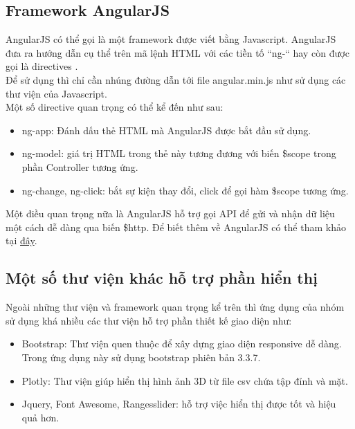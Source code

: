\subsection{Framework AngularJS}
AngularJS có thể gọi là một framework được viết bằng Javascript. AngularJS đưa ra hướng dẫn cụ thể trên mã lệnh HTML với các tiền tố ``ng-`` hay còn được gọi là directives \cite{website:angularjs}.\\
Để sử dụng thì chỉ cần nhúng đường dẫn tới file angular.min.js như sử dụng các thư viện của Javascript.\\
Một số directive quan trọng có thể kể đến như sau:
\begin{itemize}
    \item ng-app: Đánh dấu thẻ HTML mà AngularJS được bắt đầu sử dụng.
    \item ng-model: giá trị HTML trong thẻ này tương đương với biến \$scope trong phần Controller tương ứng.
    \item ng-change, ng-click: bắt sự kiện thay đổi, click để gọi hàm \$scope tương ứng.
\end{itemize}
Một điều quan trọng nữa là AngularJS hỗ trợ gọi API để gửi và nhận dữ liệu một cách dễ dàng qua biến \$http.
Để biết thêm về AngularJS có thể tham khảo tại \href{ https://docs.angularjs.org/api/ng/service/\$document
}{đây}.
\subsection{Một số thư viện khác hỗ trợ phần hiển thị}
Ngoài những thư viện và framework quan trọng kể trên thì ứng dụng của nhóm sử dụng khá nhiều các thư viện hỗ trợ phần thiết kế giao diện như:
\begin{itemize}
    \item Bootstrap: Thư viện quen thuộc để xây dựng giao diện responsive dễ dàng. Trong ứng dụng này sử dụng bootstrap phiên bản 3.3.7.
    \item Plotly: Thư viện giúp hiển thị hình ảnh 3D từ file csv chứa tập đỉnh và mặt.
    \item Jquery, Font Awesome, Rangesslider: hỗ trợ việc hiển thị được tốt và hiệu quả hơn.
\end{itemize}
